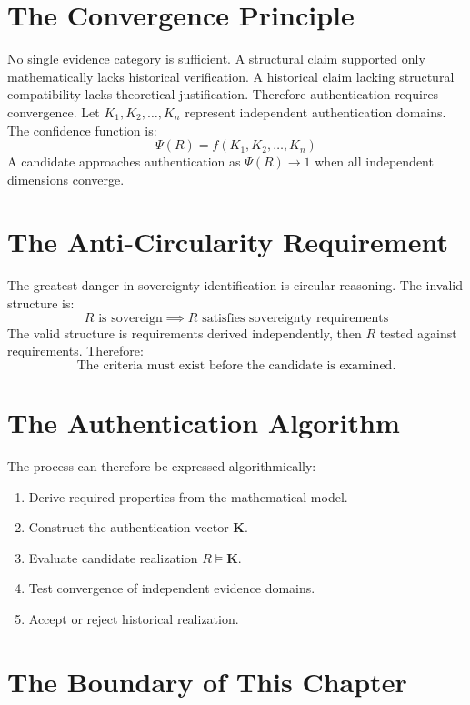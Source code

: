\documentclass[11pt,openany]{book}
\theoremstyle{plain}
\theoremstyle{definition}
\begin{document}
\section{The Convergence Principle}

No single evidence category is sufficient. A structural claim supported only mathematically lacks historical verification. A historical claim lacking structural compatibility lacks theoretical justification. Therefore authentication requires convergence. Let \(K_1, K_2, \ldots, K_n\) represent independent authentication domains. The confidence function is:
\[
\Psi(R) = f(K_1, K_2, \ldots, K_n)
\]
A candidate approaches authentication as \(\Psi(R) \to 1\) when all independent dimensions converge.

\section{The Anti-Circularity Requirement}

The greatest danger in sovereignty identification is circular reasoning. The invalid structure is:
\[
R \text{ is sovereign} \implies R \text{ satisfies sovereignty requirements}
\]
The valid structure is requirements derived independently, then \(R\) tested against requirements. Therefore:
\[
\boxed{
\text{The criteria must exist before the candidate is examined.}
}
\]

\section{The Authentication Algorithm}

The process can therefore be expressed algorithmically:
\begin{enumerate}
\item Derive required properties from the mathematical model.
\item Construct the authentication vector \(\mathbf{K}\).
\item Evaluate candidate realization \(R \models \mathbf{K}\).
\item Test convergence of independent evidence domains.
\item Accept or reject historical realization.
\end{enumerate}

\section{The Boundary of This Chapter}
\end{document}
